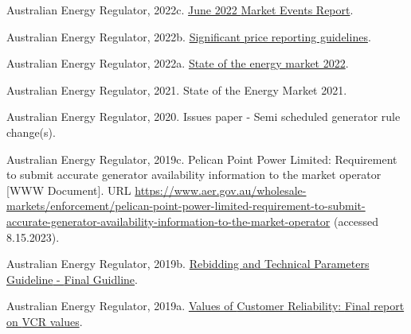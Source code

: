 \documentclass[12pt,a4paper,]{report}
\newlength{\cslhangindent}
\newenvironment{CSLReferences}[2] %
 {%
  \setlength{\parindent}{0pt}
  \ifodd #1 \everypar{\setlength{\hangindent}{\cslhangindent}}\ignorespaces\fi
  \ifnum #2 > 0
  \setlength{\parskip}{#2\baselineskip}
  \fi
 }%
 {}
\begin{document}
\begin{CSLReferences}{1}{0}
\leavevmode{}%
Australian Energy Regulator, 2022c.
\href{https://www.aer.gov.au/system/files/AER\%20June\%202022\%20Market\%20Events\%20Report-\%20FINAL\%20VERSION\%20-\%2014\%20December\%202022.pdf}{June
2022 {Market Events Report}}.

\leavevmode{}%
Australian Energy Regulator, 2022b.
\href{https://www.aer.gov.au/system/files/AER\%20-\%20Significant\%20Price\%20Reporting\%20Guidelines\%20-\%20September\%202022_0.pdf}{Significant
price reporting guidelines}.

\leavevmode{}%
Australian Energy Regulator, 2022a.
\href{https://www.aer.gov.au/system/files/State\%20of\%20the\%20energy\%20market\%202022\%20-\%20Full\%20report.pdf}{State
of the energy market 2022}.

\leavevmode{}%
Australian Energy Regulator, 2021. State of the {Energy Market} 2021.

\leavevmode{}%
Australian Energy Regulator, 2020. Issues paper - {Semi} scheduled
generator rule change(s).

\leavevmode{}%
Australian Energy Regulator, 2019c. Pelican {Point Power Limited}:
Requirement to submit accurate generator availability information to the
market operator {[}WWW Document{]}. URL
\url{https://www.aer.gov.au/wholesale-markets/enforcement/pelican-point-power-limited-requirement-to-submit-accurate-generator-availability-information-to-the-market-operator}
(accessed 8.15.2023).

\leavevmode{}%
Australian Energy Regulator, 2019b.
\href{https://www.aer.gov.au/system/files/For\%20publish\%20-\%20Rebidding\%20and\%20technical\%20parameters\%20guideline\%20-\%20final\%20guideline\%20\%282019\%20amendments\%29.pdf}{Rebidding
and {Technical Parameters Guideline} - {Final Guidline}}.

\leavevmode{}%
Australian Energy Regulator, 2019a.
\href{https://www.aer.gov.au/system/files/AER\%20-\%20Values\%20of\%20Customer\%20Reliability\%20Review\%20-\%20Final\%20Report\%20-\%20December\%202019.pdf}{Values
of {Customer Reliability}: {Final} report on {VCR} values}.


\end{CSLReferences}
\end{document}
